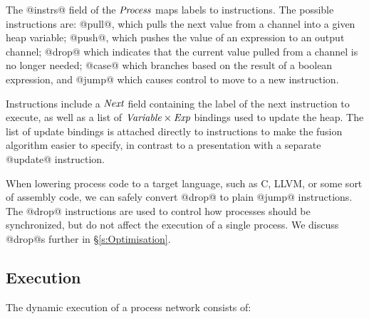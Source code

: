 The @instrs@ field of the $\textit{Process}$ maps labels to instructions. The possible instructions are: @pull@, which pulls the next value from a channel into a given heap variable; @push@, which pushes the value of an expression to an output channel;  @drop@ which indicates that the current value pulled from a channel is no longer needed; @case@ which branches based on the result of a boolean expression, and @jump@ which causes control to move to a new instruction.

Instructions include a $\textit{Next}$ field containing the label of the next instruction to execute, as well as a list of $\textit{Variable} \times \textit{Exp}$ bindings used to update the heap.
The list of update bindings is attached directly to instructions to make the fusion algorithm easier to specify, in contrast to a presentation with a separate @update@ instruction. 

When lowering process code to a target language, such as C, LLVM, or some sort of assembly code, we can safely convert @drop@ to plain @jump@ instructions. The @drop@ instructions are used to control how processes should be synchronized, but do not affect the execution of a single process. We discuss @drop@s further in \S\ref{s:Optimisation}.




\subsection{Execution}
\label{s:Process:Eval}

The dynamic execution of a process network consists of:

